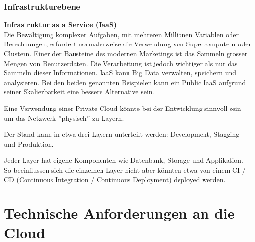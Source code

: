\documentclass[11pt,titlepage]{article}
\begin{document}
\subsubsection{Infrastrukturebene}
\label{subsec:Aufgabe-3_Infrastrukturebene}
{\large\bf Infrastruktur as a Service (IaaS)} \\\medskip
Die Bewältigung komplexer Aufgaben, mit mehreren Millionen Variablen oder Berechnungen, erfordert normalerweise die Verwendung von Supercomputern oder Clustern. 
Einer der Bausteine des modernen Marketings ist das Sammeln grosser Mengen von Benutzerdaten. Die Verarbeitung ist jedoch wichtiger als nur das Sammeln dieser Informationen. IaaS kann Big Data verwalten, speichern und analysieren. Bei den beiden genannten Beispielen kann ein Public IaaS aufgrund seiner Skalierbarkeit eine bessere Alternative sein.
\par\medskip

Eine Verwendung einer Private Cloud könnte bei der Entwicklung sinnvoll sein um das Netzwerk ''physisch'' zu Layern.

Der Stand kann in etwa drei Layern unterteilt werden: Development, Stagging und Produktion.

Jeder Layer hat eigene Komponenten wie Datenbank, Storage und Applikation. So beeinflussen sich die einzelnen Layer nicht aber könnten etwa von einem CI / CD (Continuous Integration / Continuous Deployment) deployed werden.

\section{Technische Anforderungen an die Cloud}
\end{document}
